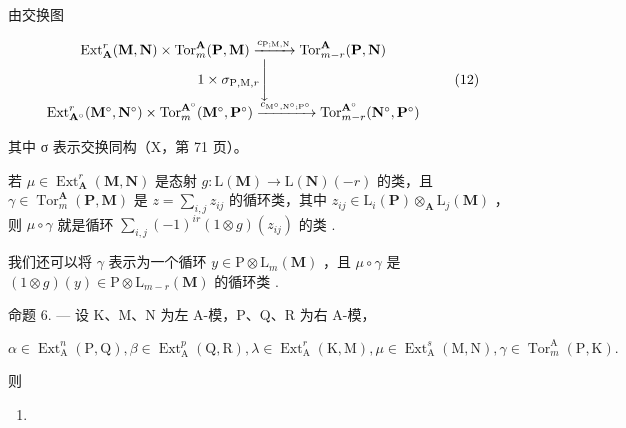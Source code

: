由交换图

\[
\begin{array}{c} \operatorname{Ext} _ {\mathbf {A}} ^ {r} (\mathbf {M}, \mathbf {N}) \times \operatorname{Tor} _ {m} ^ {\mathbf {A}} (\mathbf {P}, \mathbf {M}) \xrightarrow {c _ {\mathrm{P} ; \mathrm{M} , \mathrm{N}}} \operatorname{Tor} _ {m - r} ^ {\mathbf {A}} (\mathbf {P}, \mathbf {N}) \\ 1 \times \sigma_ {\mathrm{P}, \mathrm{M}, r} \Biggl \downarrow \\ \operatorname{Ext} _ {\mathbf {A} ^ {\circ}} ^ {r} (\mathbf {M} ^ {\circ}, \mathbf {N} ^ {\circ}) \times \operatorname{Tor} _ {m} ^ {\mathbf {A} ^ {\circ}} (\mathbf {M} ^ {\circ}, \mathbf {P} ^ {\circ}) \xrightarrow {c _ {\mathrm{M} ^ {\circ} , \mathrm{N} ^ {\circ} ; \mathrm{P} ^ {\circ}}} \operatorname{Tor} _ {m - r} ^ {\mathbf {A} ^ {\circ}} (\mathbf {N} ^ {\circ}, \mathbf {P} ^ {\circ}) \end{array}\tag{12}
\]

其中 σ 表示交换同构（X，第 71 页）。

若 \(\mu \in \operatorname{Ext}_{\mathbf{A}}^{r}(\mathbf{M}, \mathbf{N})\) 是态射 \(g: \mathrm{L}(\mathbf{M}) \to \mathrm{L}(\mathbf{N})(-r)\) 的类，且 \(\gamma \in \operatorname{Tor}_{m}^{\mathbf{A}}(\mathbf{P}, \mathbf{M})\) 是 \(z = \sum_{i,j} z_{ij}\) 的循环类，其中 \(z_{ij} \in \mathrm{L}_i(\mathbf{P}) \otimes_{\mathbf{A}} \mathrm{L}_j(\mathbf{M})\) ，则 \(\mu \circ \gamma\) 就是循环 \(\sum_{i,j} (-1)^{ir}(1 \otimes g)(z_{ij})\) 的类 .

我们还可以将 \(\gamma\) 表示为一个循环 \(y \in \mathrm{P} \otimes \mathrm{L}_{m}(\mathbf{M})\) ，且 \(\mu \circ \gamma\) 是 \((1 \otimes g)(y) \in \mathrm{P} \otimes \mathrm{L}_{m-r}(\mathbf{M})\) 的循环类 .

命题 6. --- 设 K、M、N 为左 A-模，P、Q、R 为右 A-模，

\[
\alpha \in \operatorname{Ext} _ {\mathrm{A}} ^ {n} (\mathrm{P}, \mathrm{Q}), \beta \in \operatorname{Ext} _ {\mathrm{A}} ^ {p} (\mathrm{Q}, \mathrm{R}), \lambda \in \operatorname{Ext} _ {\mathrm{A}} ^ {r} (\mathrm{K}, \mathrm{M}), \mu \in \operatorname{Ext} _ {\mathrm{A}} ^ {s} (\mathrm{M}, \mathrm{N}), \gamma \in \operatorname{Tor} _ {m} ^ {\mathrm{A}} (\mathrm{P}, \mathrm{K}).
\]

则

\begin{enumerate}
\def\labelenumi{(\arabic{enumi})}
\setcounter{enumi}{12}
\tightlist
\item
\end{enumerate}

